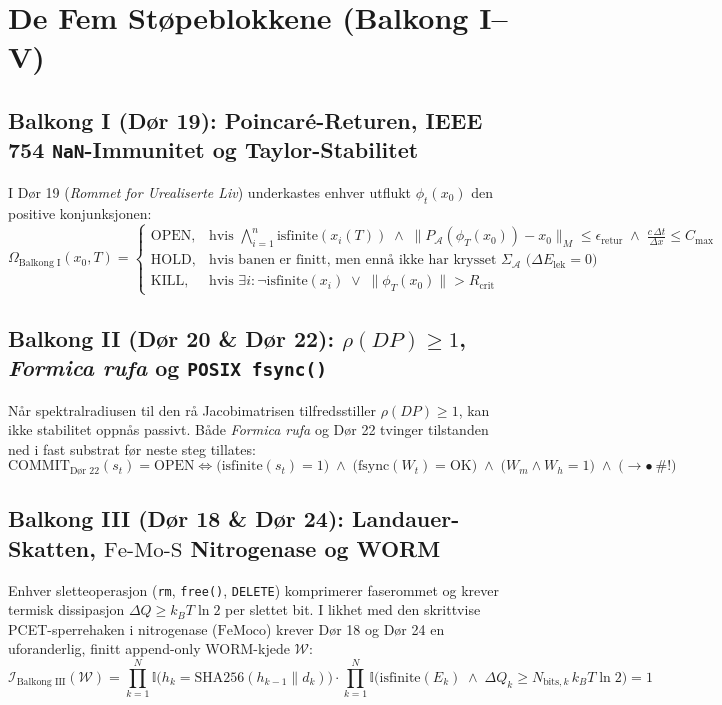 \documentclass[11pt,a4paper,oneside]{book}
\theoremstyle{definition}
\begin{document}
\chapter{De Fem Støpeblokkene (Balkong I--V)}

\section{Balkong I (Dør 19): Poincaré-Returen, IEEE 754 \texttt{NaN}-Immunitet og Taylor-Stabilitet}
I Dør 19 (\emph{Rommet for Urealiserte Liv}) underkastes enhver utflukt $\phi_t(x_0)$ den positive konjunksjonen:
\begin{equation}
\Omega_{\text{Balkong I}}(x_0, T) = \begin{cases}
\mathrm{OPEN}, & \text{hvis } \bigwedge_{i=1}^n \mathrm{isfinite}(x_i(T)) \;\land\; \lVert P_{\mathcal{A}}(\phi_T(x_0)) - x_0 \rVert_M \le \epsilon_{\mathrm{retur}} \;\land\; \frac{c\,\Delta t}{\Delta x} \le C_{\max} \\
\mathrm{HOLD}, & \text{hvis banen er finitt, men ennå ikke har krysset } \Sigma_{\mathcal{A}} \text{ ($\Delta E_{\mathrm{lek}} = 0$)} \\
\mathrm{KILL}, & \text{hvis } \exists i : \neg\mathrm{isfinite}(x_i) \;\lor\; \lVert \phi_T(x_0) \rVert > R_{\mathrm{crit}}
\end{cases}
\end{equation}

\section{Balkong II (Dør 20 \& Dør 22): $\rho(DP) \ge 1$, \emph{Formica rufa} og \texttt{POSIX fsync()}}
Når spektralradiusen til den rå Jacobimatrisen tilfredsstiller $\rho(DP) \ge 1$, kan ikke stabilitet oppnås passivt. Både \emph{Formica rufa} og Dør 22 tvinger tilstanden ned i fast substrat før neste steg tillates:
\begin{equation}
\mathrm{COMMIT}_{\text{Dør 22}}(s_t) = \mathrm{OPEN} \iff \Big(\mathrm{isfinite}(s_t) = 1\Big) \;\land\; \Big(\mathrm{fsync}(W_t) = \mathrm{OK}\Big) \;\land\; \Big(W_m \land W_h = 1\Big) \;\land\; \Big(\to \bullet \ \#!\Big)
\end{equation}

\section{Balkong III (Dør 18 \& Dør 24): Landauer-Skatten, $\mathrm{Fe\text{-}Mo\text{-}S}$ Nitrogenase og WORM}
Enhver sletteoperasjon (\texttt{rm}, \texttt{free()}, \texttt{DELETE}) komprimerer faserommet og krever termisk dissipasjon $\Delta Q \ge k_B T \ln 2$ per slettet bit. I likhet med den skrittvise PCET-sperrehaken i nitrogenase ($\mathrm{FeMoco}$) krever Dør 18 og Dør 24 en uforanderlig, finitt append-only WORM-kjede $\mathcal{W}$:
\begin{equation}
\mathcal{I}_{\text{Balkong III}}(\mathcal{W}) = \prod_{k=1}^{N} \mathbb{I}\!\Big(h_k = \mathrm{SHA256}(h_{k-1} \parallel d_k)\Big) \cdot \prod_{k=1}^{N} \mathbb{I}\!\Big(\mathrm{isfinite}(E_k) \;\land\; \Delta Q_k \ge N_{\mathrm{bits},k}\, k_B T \ln 2\Big) = 1
\end{equation}
\end{document}
